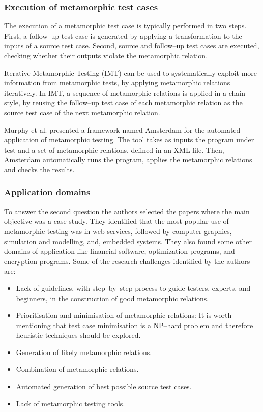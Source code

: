 		\subsubsection{Execution of metamorphic test cases}
		The execution of a metamorphic test case is typically performed in two steps. First, a follow–up test case is generated by applying a transformation to the inputs of a source test case. Second, source and follow–up test cases are executed, checking whether their outputs violate the metamorphic relation. \par
		Iterative Metamorphic Testing (IMT) can be used to systematically exploit more information from metamorphic tests, by applying metamorphic relations iteratively. In IMT, a sequence of metamorphic relations is applied in a chain style, by reusing the follow–up test case of each metamorphic relation as the source test case of the next metamorphic relation. \par
		Murphy et al. \cite{Murphy2009} presented a framework named Amsterdam for the automated application of metamorphic testing. The tool takes as inputs the program under test and a set of metamorphic relations, defined in an XML file. Then, Amsterdam automatically runs the program, applies the metamorphic relations and checks the results.
		\subsubsection{Application domains}
		To answer the second question the authors selected the papers where the main objective was a case study. They identified that the most popular use of metamorphic testing was in web services, followed by computer graphics, simulation and modelling, and, embedded systems. They also found some other domains of application like financial software, optimization programs, and encryption programs.
		Some of the research challenges identified by the authors are:
		\begin{itemize}
			\item Lack of guidelines, with step–by–step process to guide testers, experts, and beginners, in the construction of good metamorphic relations.
			\item Prioritisation and minimisation of metamorphic relations: It is worth mentioning that test case minimisation is a NP–hard problem and therefore heuristic techniques should be explored.
			\item Generation of likely metamorphic relations.
			\item Combination of metamorphic relations.
			\item Automated generation of best possible source test cases.
			\item Lack of metamorphic testing tools.
		\end{itemize}



